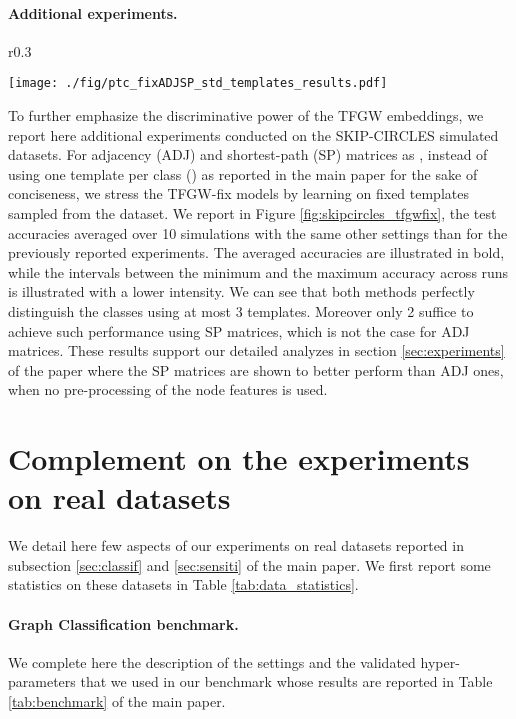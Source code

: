 \documentclass{article}
\begin{document}
{\paragraph{Additional experiments.} \begin{wrapfigure}{r}{0.3\textwidth}  \vspace{-7mm}
	\begin{center}
		\texttt{[image: ./fig/ptc\_fixADJSP\_std\_templates\_results.pdf]}
	\end{center}
	\vspace{-5mm}
	\caption{\label{fig:skipcircles_tfgwfix} Test accuracies on SKIP-CIRCLES of TFGW-fix for .} 
\end{wrapfigure}
To further emphasize the discriminative power of the TFGW embeddings, we report here additional experiments conducted on the SKIP-CIRCLES simulated datasets. For adjacency (ADJ) and shortest-path (SP) matrices as , instead of using one template per class () as reported in the main paper for the sake of conciseness, we stress the TFGW-fix models by learning on  fixed templates sampled from the dataset. We report in Figure \ref{fig:skipcircles_tfgwfix}, the test accuracies averaged over 10 simulations with the same other settings than for the previously reported experiments. The averaged accuracies are illustrated in bold, while the intervals between the minimum and the maximum accuracy across runs is illustrated with a lower intensity. We can see that both methods perfectly distinguish the classes using at most 3 templates. Moreover only 2 suffice to achieve such performance using SP matrices, which is not the case for ADJ matrices. These results support our detailed analyzes in section \ref{sec:experiments} of the paper where the SP matrices are shown to better perform than ADJ ones, when no pre-processing of the node features is used.
\section{Complement on the experiments on real datasets}
We detail here few aspects of our experiments on real datasets reported in subsection \ref{sec:classif} and \ref{sec:sensiti} of the main paper. We first report some statistics on these datasets in Table \ref{tab:data_statistics}. 

\paragraph{Graph Classification benchmark.} We complete here the description of the settings and the validated hyper-parameters that we used in our benchmark whose results are reported in Table \ref{tab:benchmark} of the main paper.

}
\end{document}
